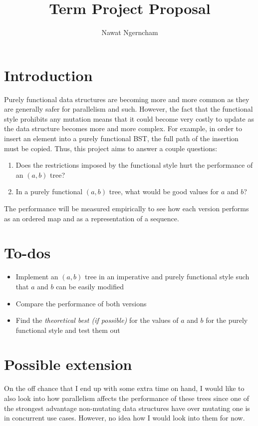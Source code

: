 \documentclass{article}
\author{Nawat Ngerncham}
\title{Term Project Proposal}
\begin{document}
\maketitle

\section{Introduction}

Purely functional data structures are becoming more and more common as they are generally safer for parallelism and such. However, the fact that the functional style prohibits any mutation means that it could become very costly to update as the data structure becomes more and more complex. For example, in order to insert an element into a purely functional BST, the full path of the insertion must be copied. Thus, this project aims to answer a couple questions: 

\begin{enumerate}
	\item Does the restrictions imposed by the functional style hurt the performance of an $(a, b)$ tree?
	\item In a purely functional $(a, b)$ tree, what would be good values for $a$ and $b$?
\end{enumerate}

The performance will be measured empirically to see how each version performs as an ordered map and as a representation of a sequence.

\section{To-dos}

\begin{itemize}
	\item Implement an $(a, b)$ tree in an imperative and purely functional style such that $a$ and $b$ can be easily modified
	\item Compare the performance of both versions
	\item Find the \textit{theoretical best (if possible)} for the values of $a$ and $b$ for the purely functional style and test them out
\end{itemize}

\section{Possible extension}

On the off chance that I end up with some extra time on hand, I would like to also look into how parallelism affects the performance of these trees since one of the strongest advantage non-mutating data structures have over mutating one is in concurrent use cases. However, no idea how I would look into them for now.
\end{document}
